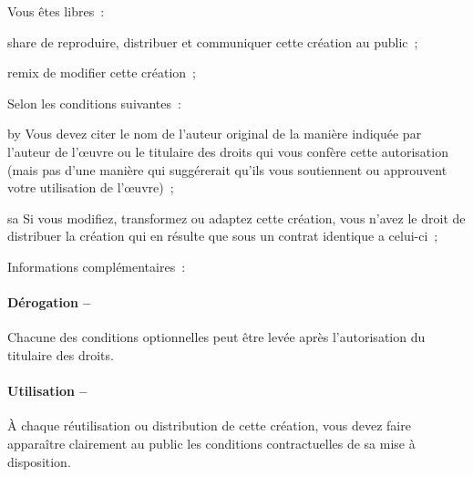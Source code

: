{  %
  \begin{lblock}{Vous êtes libres~:}

    \begin{pictonote}{share}
      de reproduire, distribuer et communiquer cette création au
      public~;
    \end{pictonote}

    \begin{pictonote}{remix}
      de modifier cette création~;
    \end{pictonote}

  \end{lblock}
  \begin{lblock}{Selon les conditions suivantes~:}

    \begin{pictonote}{by}
       Vous devez citer le nom de l'auteur
      original de la manière indiquée par l'auteur de l'œuvre ou le
      titulaire des droits qui vous confère cette autorisation (mais pas
      d'une manière qui suggérerait qu'ils vous soutiennent ou
      approuvent votre utilisation de l'œuvre)~;
    \end{pictonote}

    \begin{pictonote}{sa}
       Si
      vous modifiez, transformez ou adaptez cette création, vous n'avez
      le droit de distribuer la création qui en résulte que sous un
      contrat identique a celui-ci~;
    \end{pictonote}

  \end{lblock}
  \begin{lblock}{Informations complémentaires~:}

    \hspace{0.4cm}
    \parbox{15cm}{
      \paragraph{Dérogation --}
      Chacune des conditions optionnelles peut être levée après
      l'autorisation du titulaire des droits.

      \paragraph{Utilisation --}
      À chaque réutilisation ou distribution de cette création, vous
      devez faire apparaître clairement au public les conditions
      contractuelles de sa mise à disposition.

}
\end{lblock}}
